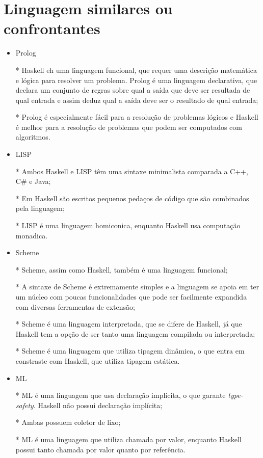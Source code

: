 \chapter{Linguagem similares ou confrontantes}

\begin{itemize}
  \item Prolog
  
  * Haskell eh uma linguagem funcional, que requer uma descrição matemática e lógica para resolver um problema. Prolog é uma linguagem declarativa, 
  que declara um conjunto de regras sobre qual a saída que deve ser resultada de qual entrada e assim deduz qual a saída deve ser o resultado de qual entrada;

  * Prolog é especialmente fácil para a resolução de problemas lógicos e Haskell é melhor para a resolução de problemas que podem ser computados com algoritmos.

  \item LISP 
  
  * Ambos Haskell e LISP têm uma sintaxe minimalista comparada a C++, C\# e Java;

  * Em Haskell são escritos pequenos pedaços de código que são combinados pela linguagem;

  * LISP é uma linguagem homiconica, enquanto Haskell usa computação monadica.

  \item Scheme 
  
  * Scheme, assim como Haskell, também é uma linguagem funcional;

  * A sintaxe de Scheme é extremamente simples e a linguagem se apoia em ter um núcleo com poucas funcionalidades que pode ser 
  facilmente expandida com diversas ferramentas de extensão;

  * Scheme é uma linguagem interpretada, que se difere de Haskell, já que Haskell tem a opção de ser tanto uma linguagem compilada ou interpretada;

  * Scheme é uma linguagem que utiliza tipagem dinâmica, o que entra em constraste com Haskell, que utiliza tipagem estática.

  \item ML 
  
  * ML é uma linguagem que usa declaração implícita, o que garante \emph{type-safety}. Haskell não possui declaração implícita;

  * Ambas possuem coletor de lixo;

  * ML é uma linguagem que utiliza chamada por valor, enquanto Haskell possui tanto chamada por valor quanto por referência.


\end{itemize}
